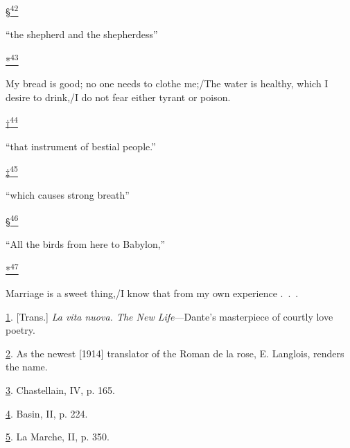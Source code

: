 \protect\hypertarget{23_NOTES.xhtmlux5cux23id_2940}{\protect\hyperlink{11_Chapter_Four__THE_FORMS_OF_LOVE.xhtmlux5cux23id_2939}{§\textsuperscript{42}}}
``the shepherd and the shepherdess''

\protect\hypertarget{23_NOTES.xhtmlux5cux23id_2942}{\protect\hyperlink{11_Chapter_Four__THE_FORMS_OF_LOVE.xhtmlux5cux23id_2941}{*\textsuperscript{43}}}
My bread is good; no one needs to clothe me;/The water is healthy, which
I desire to drink,/I do not fear either tyrant or poison.

\protect\hypertarget{23_NOTES.xhtmlux5cux23id_2944}{\protect\hyperlink{11_Chapter_Four__THE_FORMS_OF_LOVE.xhtmlux5cux23id_2943}{†\textsuperscript{44}}}
``that instrument of bestial people.''

\protect\hypertarget{23_NOTES.xhtmlux5cux23id_2946}{\protect\hyperlink{11_Chapter_Four__THE_FORMS_OF_LOVE.xhtmlux5cux23id_2945}{‡\textsuperscript{45}}}
``which causes strong breath''

\protect\hypertarget{23_NOTES.xhtmlux5cux23id_2948}{\protect\hyperlink{11_Chapter_Four__THE_FORMS_OF_LOVE.xhtmlux5cux23id_2947}{§\textsuperscript{46}}}
``All the birds from here to Babylon,''

\protect\hypertarget{23_NOTES.xhtmlux5cux23id_2950}{\protect\hyperlink{11_Chapter_Four__THE_FORMS_OF_LOVE.xhtmlux5cux23id_2949}{*\textsuperscript{47}}}
Marriage is a sweet thing,/I know that from my own experience .~.~.

\protect\hypertarget{23_NOTES.xhtmlux5cux23id_1487}{\protect\hyperlink{11_Chapter_Four__THE_FORMS_OF_LOVE.xhtmlux5cux23id_1486}{1}}.
{[}Trans.{]} \emph{La vita nuova. The New Life}---Dante's masterpiece of
courtly love poetry.

\protect\hypertarget{23_NOTES.xhtmlux5cux23id_1485}{\protect\hyperlink{11_Chapter_Four__THE_FORMS_OF_LOVE.xhtmlux5cux23id_1484}{2}}.
As the newest {[}1914{]} translator of the Roman de la rose, E.
Langlois, renders the name.

\protect\hypertarget{23_NOTES.xhtmlux5cux23id_1483}{\protect\hyperlink{11_Chapter_Four__THE_FORMS_OF_LOVE.xhtmlux5cux23id_1482}{3}}.
Chastellain, IV, p. 165.

\protect\hypertarget{23_NOTES.xhtmlux5cux23id_1481}{\protect\hyperlink{11_Chapter_Four__THE_FORMS_OF_LOVE.xhtmlux5cux23id_1480}{4}}.
Basin, II, p. 224.

\protect\hypertarget{23_NOTES.xhtmlux5cux23id_1479}{\protect\hyperlink{11_Chapter_Four__THE_FORMS_OF_LOVE.xhtmlux5cux23id_1478}{5}}.
La Marche, II, p. 350.

